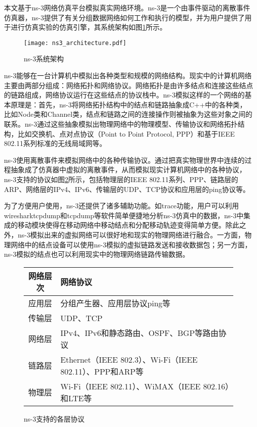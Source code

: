 
本文基于ns-3网络仿真平台模拟真实网络环境。ns-3是一个由事件驱动的离散事件仿真器，ns-3提供了有关分组数据网络如何工作和执行的模型，并为用户提供了用于进行仿真实验的仿真引擎\cite{ns-3,matthias2010ns3}，其系统架构如图\ref{fig:c2:ns3 architecture}所示。

\begin{figure}[H]
  \centering
  \texttt{[image: ns3\_architecture.pdf]}
  \caption{ns-3系统架构}
  \label{fig:c2:ns3 architecture}
\end{figure}

ns-3能够在一台计算机中模拟出各种类型和规模的网络结构。现实中的计算机网络主要由两部分组成：网络拓扑和网络协议。网络拓扑是由许多结点和连接这些结点的链路组成，网络协议运行在这些结点的协议栈中。ns-3模拟这样的一个网络的基本原理是：首先，ns-3将网络拓扑结构中的结点和链路抽象成C++中的各种类，比如Node类和Channel类，结点和链路之间的连接操作则被抽象为这些对象之间的联系。ns-3通过这些抽象模拟出物理网络中的物理模型、传输协议和网络拓扑结构，比如交换机、点对点协议（Point to Point Protocol, PPP）和基于IEEE 802.11系列标准的无线局域网等。

ns-3使用离散事件来模拟网络中的各种传输协议。通过把真实物理世界中连续的过程抽象成了仿真器中虚拟的离散事件，从而模拟现实计算机网络中的各种协议，ns-3支持的协议如图\ref{fig:c2:protocols supported in ns-3}所示，包括物理层的IEEE 802.11系列、PPP、链路层的ARP、网络层的IPv4、IPv6、传输层的UDP、TCP协议和应用层的ping协议等。

为了方便用户使用，ns-3还提供了诸多辅助功能。如trace功能，用户可以利用wiresharktcpdump和tcpdump等软件简单便捷地分析ns-3仿真中的数据，ns-3中集成的移动模块使得在移动网络中移动结点和分配移动轨迹变得简单方便。除此之外，ns-3模拟出来的虚拟网络可以很好地和现实的物理网络进行融合。一方面，物理网络中的结点设备可以使用ns-3模拟的虚拟链路发送和接收数据包；另一方面，ns-3模拟的结点也可以利用现实中的物理网络链路传输数据。

\begin{figure}[H]
  \begin{table}[H]
      \begin{tabularx}{\textwidth}{cY}
      \toprule
          网络层次 & 网络协议 \\
      \midrule
          应用层 & 分组产生器、应用层协议ping等 \\
          传输层 & UDP、TCP \\
          网络层 & IPv4、IPv6和静态路由、OSPF、BGP等路由协议 \\
          链路层 & Ethernet（IEEE 802.3）、Wi-Fi（IEEE 802.11）、PPP和ARP等 \\
          物理层 & Wi-Fi（IEEE 802.11）、WiMAX（IEEE 802.16）和LTE等 \\
      \bottomrule
      \end{tabularx}
  \end{table}
  \caption{ns-3支持的各层协议}
  \label{fig:c2:protocols supported in ns-3}
\end{figure}

